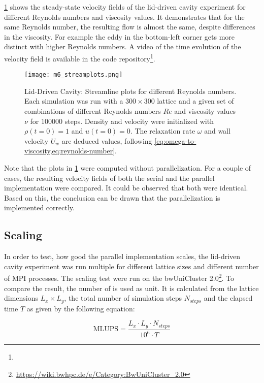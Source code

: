 \cref{fig:lid:streamplots} shows the steady-state velocity fields of the lid-driven cavity experiment for different Reynolds numbers and viscosity values. It demonstrates that for the same Reynolds number, the resulting flow is almost the same, despite differences in the viscosity. For example the eddy in the bottom-left corner gets more distinct with higher Reynolds numbers. A video of the time evolution of the velocity field is available in the code repository\footnote{\therepository}.

\begin{figure}[htp]
    \texttt{[image: m6\_streamplots.png]}
    \caption[Lid-Driven Cavity: Streamline plots for different Reynolds numbers]{Lid-Driven Cavity: Streamline plots for different Reynolds numbers. Each simulation was run with a $300\times300$ lattice and a given set of combinations of different Reynolds numbers $Re$ and viscosity values $\nu$ for $100000$ steps. Density and velocity were initialized with $\rho(t=0)=1$ and $u(t=0)=0$. The relaxation rate $\omega$ and wall velocity $U_w$ are deduced values, following \cref{eq:omega-to-viscosity,eq:reynolds-number}.}
    \label{fig:lid:streamplots}
\end{figure}

Note that the plots in \cref{fig:lid:streamplots} were computed without parallelization. For a couple of cases, the resulting velocity fields of both the serial and the parallel implementation were compared. It could be observed that both were identical. Based on this, the conclusion can be drawn that the parallelization is implemented correctly.

\subsection{Scaling}

In order to test, how good the parallel implementation scales, the lid-driven cavity experiment was run multiple for different lattice sizes and different number of MPI processes. The scaling test were run on the bwUniCluster 2.0\footnote{\href{https://wiki.bwhpc.de/e/Category:BwUniCluster\_2.0}{https://wiki.bwhpc.de/e/Category:BwUniCluster\_2.0}}. To compare the result, the number of  is used as unit. It is calculated from the lattice dimensions $L_x \times L_y$, the total number of simulation steps $N_{steps}$ and the elapsed time $T$ as given by the following equation:

\begin{equation}
    \label{eq:mlups}
    \text{MLUPS} = \frac{L_x \cdot L_y \cdot N_{steps}}{10^6 \cdot T}
\end{equation}

